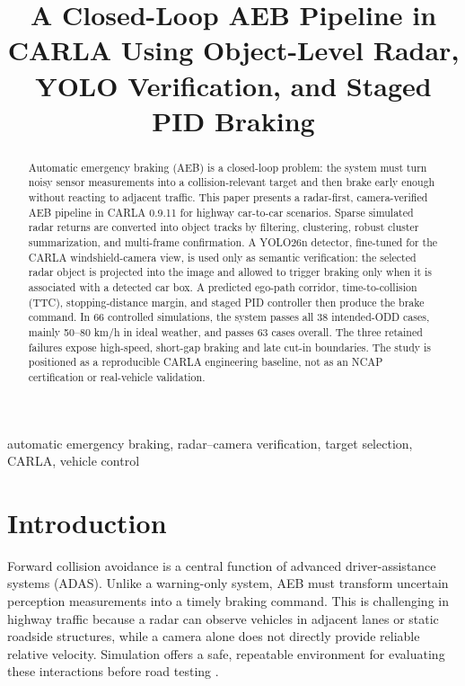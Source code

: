 \documentclass[conference]{IEEEtran}
\title{A Closed-Loop AEB Pipeline in CARLA Using Object-Level Radar, YOLO Verification, and Staged PID Braking}
\author{
\IEEEauthorblockN{Mai Viet Hoang and Duc An Pham}
\IEEEauthorblockA{
\textit{Hanoi University of Science and Technology}\\
Hanoi, Vietnam\\
hoangmai04222@gmail.com
}
}
\begin{document}
\maketitle

\begin{abstract}
Automatic emergency braking (AEB) is a closed-loop problem: the system must
turn noisy sensor measurements into a collision-relevant target and then brake
early enough without reacting to adjacent traffic. This paper presents a
radar-first, camera-verified AEB pipeline in CARLA 0.9.11 for highway
car-to-car scenarios. Sparse simulated radar returns are converted into object
tracks by filtering, clustering, robust cluster summarization, and multi-frame
confirmation. A YOLO26n detector, fine-tuned for the CARLA windshield-camera
view, is used only as semantic verification: the selected radar object is
projected into the image and allowed to trigger braking only when it is
associated with a detected car box. A predicted ego-path corridor,
time-to-collision (TTC), stopping-distance margin, and staged PID controller
then produce the brake command. In 66 controlled simulations, the system passes
all 38 intended-ODD cases, mainly 50--80 km/h in ideal weather, and passes 63
cases overall. The three retained failures expose high-speed, short-gap braking
and late cut-in boundaries. The study is positioned as a reproducible CARLA
engineering baseline, not as an NCAP certification or real-vehicle validation.
\end{abstract}

\begin{IEEEkeywords}
automatic emergency braking, radar--camera verification, target selection,
CARLA, vehicle control
\end{IEEEkeywords}

\section{Introduction}
Forward collision avoidance is a central function of advanced driver-assistance
systems (ADAS). Unlike a warning-only system, AEB must transform uncertain
perception measurements into a timely braking command. This is challenging in
highway traffic because a radar can observe vehicles in adjacent lanes or static
roadside structures, while a camera alone does not directly provide reliable
relative velocity. Simulation offers a safe, repeatable environment for
evaluating these interactions before road testing \cite{dosovitskiy2017carla,carla_docs}.
\end{document}
